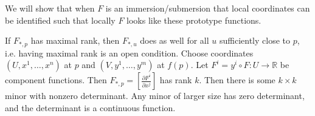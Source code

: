 We will show that when $F$ is an immersion/submersion that local
coordinates can be identified such that locally $F$ looks like these
prototype functions.

\begin{remark}
If $F_{\ast, p}$ has maximal rank, then $F_{\ast, u}$ does as well for
all $u$ sufficiently close to $p$, i.e. having maximal rank is an open
condition. Choose coordinates $(U, x^1, \dots, x^n)$ at $p$
and $(V, y^1, \dots, y^m)$ at $f(p)$. Let
$F^i = y^i \circ F : U \to \mathbb{R}$ be component functions. Then
$F_{\ast, p} = \left[\frac{\partial F^i}{\partial x^j}\right]$ has
rank $k$. Then there is some $k \times k$ minor with nonzero
determinant. Any minor of larger size has zero determinant,
 and the determinant is a continuous function.
\end{remark}
